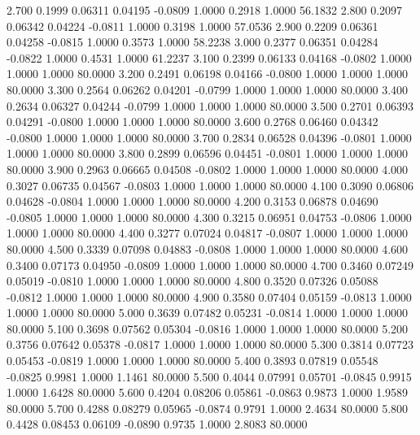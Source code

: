    2.700   0.1999   0.06311   0.04195  -0.0809   1.0000   0.2918   1.0000  56.1832
   2.800   0.2097   0.06342   0.04224  -0.0811   1.0000   0.3198   1.0000  57.0536
   2.900   0.2209   0.06361   0.04258  -0.0815   1.0000   0.3573   1.0000  58.2238
   3.000   0.2377   0.06351   0.04284  -0.0822   1.0000   0.4531   1.0000  61.2237
   3.100   0.2399   0.06133   0.04168  -0.0802   1.0000   1.0000   1.0000  80.0000
   3.200   0.2491   0.06198   0.04166  -0.0800   1.0000   1.0000   1.0000  80.0000
   3.300   0.2564   0.06262   0.04201  -0.0799   1.0000   1.0000   1.0000  80.0000
   3.400   0.2634   0.06327   0.04244  -0.0799   1.0000   1.0000   1.0000  80.0000
   3.500   0.2701   0.06393   0.04291  -0.0800   1.0000   1.0000   1.0000  80.0000
   3.600   0.2768   0.06460   0.04342  -0.0800   1.0000   1.0000   1.0000  80.0000
   3.700   0.2834   0.06528   0.04396  -0.0801   1.0000   1.0000   1.0000  80.0000
   3.800   0.2899   0.06596   0.04451  -0.0801   1.0000   1.0000   1.0000  80.0000
   3.900   0.2963   0.06665   0.04508  -0.0802   1.0000   1.0000   1.0000  80.0000
   4.000   0.3027   0.06735   0.04567  -0.0803   1.0000   1.0000   1.0000  80.0000
   4.100   0.3090   0.06806   0.04628  -0.0804   1.0000   1.0000   1.0000  80.0000
   4.200   0.3153   0.06878   0.04690  -0.0805   1.0000   1.0000   1.0000  80.0000
   4.300   0.3215   0.06951   0.04753  -0.0806   1.0000   1.0000   1.0000  80.0000
   4.400   0.3277   0.07024   0.04817  -0.0807   1.0000   1.0000   1.0000  80.0000
   4.500   0.3339   0.07098   0.04883  -0.0808   1.0000   1.0000   1.0000  80.0000
   4.600   0.3400   0.07173   0.04950  -0.0809   1.0000   1.0000   1.0000  80.0000
   4.700   0.3460   0.07249   0.05019  -0.0810   1.0000   1.0000   1.0000  80.0000
   4.800   0.3520   0.07326   0.05088  -0.0812   1.0000   1.0000   1.0000  80.0000
   4.900   0.3580   0.07404   0.05159  -0.0813   1.0000   1.0000   1.0000  80.0000
   5.000   0.3639   0.07482   0.05231  -0.0814   1.0000   1.0000   1.0000  80.0000
   5.100   0.3698   0.07562   0.05304  -0.0816   1.0000   1.0000   1.0000  80.0000
   5.200   0.3756   0.07642   0.05378  -0.0817   1.0000   1.0000   1.0000  80.0000
   5.300   0.3814   0.07723   0.05453  -0.0819   1.0000   1.0000   1.0000  80.0000
   5.400   0.3893   0.07819   0.05548  -0.0825   0.9981   1.0000   1.1461  80.0000
   5.500   0.4044   0.07991   0.05701  -0.0845   0.9915   1.0000   1.6428  80.0000
   5.600   0.4204   0.08206   0.05861  -0.0863   0.9873   1.0000   1.9589  80.0000
   5.700   0.4288   0.08279   0.05965  -0.0874   0.9791   1.0000   2.4634  80.0000
   5.800   0.4428   0.08453   0.06109  -0.0890   0.9735   1.0000   2.8083  80.0000
